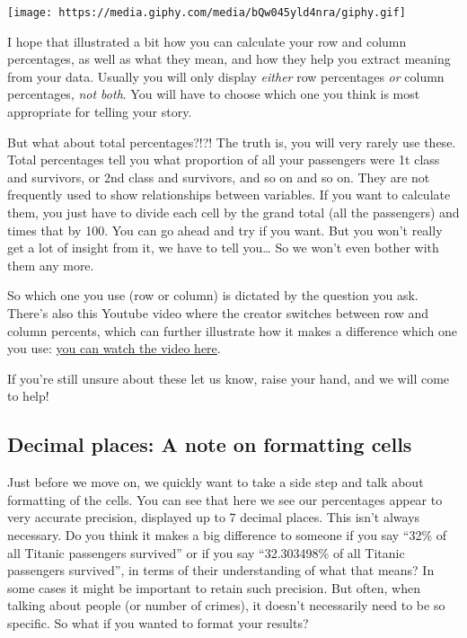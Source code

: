 \documentclass[
]{book}
\begin{document}
\texttt{[image: https://media.giphy.com/media/bQw045yld4nra/giphy.gif]}

I hope that illustrated a bit how you can calculate your row and column percentages, as well as what they mean, and how they help you extract meaning from your data. Usually you will only display \emph{either} row percentages \emph{or} column percentages, \emph{not both}. You will have to choose which one you think is most appropriate for telling your story.

But what about total percentages?!?! The truth is, you will very rarely use these. Total percentages tell you what proportion of all your passengers were 1t class and survivors, or 2nd class and survivors, and so on and so on. They are not frequently used to show relationships between variables. If you want to calculate them, you just have to divide each cell by the grand total (all the passengers) and times that by 100. You can go ahead and try if you want. But you won't really get a lot of insight from it, we have to tell you\ldots{} So we won't even bother with them any more.

So which one you use (row or column) is dictated by the question you ask. There's also this Youtube video where the creator switches between row and column percents, which can further illustrate how it makes a difference which one you use: \href{https://www.youtube.com/watch?v=tGVTIrNeWio}{you can watch the video here}.

If you're still unsure about these let us know, raise your hand, and we will come to help!

\hypertarget{decimal-places-a-note-on-formatting-cells}{%
\subsection{Decimal places: A note on formatting cells}\label{decimal-places-a-note-on-formatting-cells}}

Just before we move on, we quickly want to take a side step and talk about formatting of the cells. You can see that here we see our percentages appear to very accurate precision, displayed up to 7 decimal places. This isn't always necessary. Do you think it makes a big difference to someone if you say ``32\% of all Titanic passengers survived'' or if you say ``32.303498\% of all Titanic passengers survived'', in terms of their understanding of what that means? In some cases it might be important to retain such precision. But often, when talking about people (or number of crimes), it doesn't necessarily need to be so specific. So what if you wanted to format your results?
\end{document}
